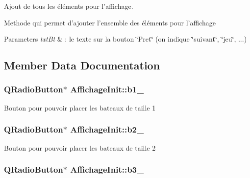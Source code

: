 Ajout de tous les éléments pour l'affichage. 

Methode qui permet d'ajouter l'ensemble des éléments pour l'affichage


\begin{DoxyParams}{Parameters}
{\em txt\+Bt} & \+: le texte sur la bouton \char`\"{}\+Pret\char`\"{} (on indique \char`\"{}suivant\char`\"{}, \char`\"{}jeu\char`\"{}, ...) \\
\hline
\end{DoxyParams}


\subsection{Member Data Documentation}
\hypertarget{classAffichageInit_a705aa3459121ac5b4ef60520fb0b509f}{
\subsubsection[{b1\+\_\+}]{\setlength{\rightskip}{0pt plus 5cm}Q\+Radio\+Button$\ast$ Affichage\+Init\+::b1\+\_\+\hspace{0.3cm}{\ttfamily [protected]}}}\label{classAffichageInit_a705aa3459121ac5b4ef60520fb0b509f}
Bouton pour pouvoir placer les bateaux de taille 1 \hypertarget{classAffichageInit_ac8c97eaabcc52302156b5d0fb2dd4b7f}{
\subsubsection[{b2\+\_\+}]{\setlength{\rightskip}{0pt plus 5cm}Q\+Radio\+Button$\ast$ Affichage\+Init\+::b2\+\_\+\hspace{0.3cm}{\ttfamily [protected]}}}\label{classAffichageInit_ac8c97eaabcc52302156b5d0fb2dd4b7f}
Bouton pour pouvoir placer les bateaux de taille 2 \hypertarget{classAffichageInit_afc2ce79e46033da8e7949f69fee1811c}{
\subsubsection[{b3\+\_\+}]{\setlength{\rightskip}{0pt plus 5cm}Q\+Radio\+Button$\ast$ Affichage\+Init\+::b3\+\_\+\hspace{0.3cm}{\ttfamily [protected]}}}\label{classAffichageInit_afc2ce79e46033da8e7949f69fee1811c}
